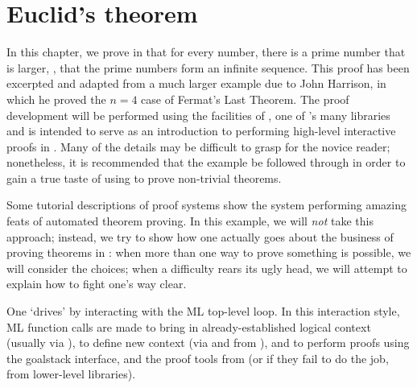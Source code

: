 
\chapter{Euclid's theorem}
\label{chap:euclid}

\setcounter{sessioncount}{0}

In this chapter, we prove in \holn{} that for every number, there is a
prime number that is larger, \ie, that the prime numbers form an
infinite sequence. This proof has been excerpted and adapted from a
much larger example due to John Harrison, in which he proved the $n =
4$ case of Fermat's Last Theorem. The proof development will be
performed using the facilities of , one of \HOL's many
libraries and is intended to serve as an introduction to performing
high-level interactive proofs in \holn.  Many of the details may be
difficult to grasp for the novice reader; nonetheless, it is
recommended that the example be followed through in order to gain a
true taste of using \HOL{} to prove non-trivial theorems.

Some tutorial descriptions of proof systems show the system performing
amazing feats of automated theorem proving. In this example, we will
{\it not\/} take this approach; instead, we try to show how one
actually goes about the business of proving theorems in \holn{}: when
more than one way to prove something is possible, we will consider the
choices; when a difficulty rears its ugly head, we will attempt to
explain how to fight one's way clear.

One `drives' \holn{} by interacting with the ML top-level loop. In this
interaction style, ML function calls are made to bring in
already-established logical context (usually via ), to define
new context (via  and  from
), and to perform proofs using the goalstack interface, and
the proof tools from  (or if they fail to do the job, from
lower-level libraries).


